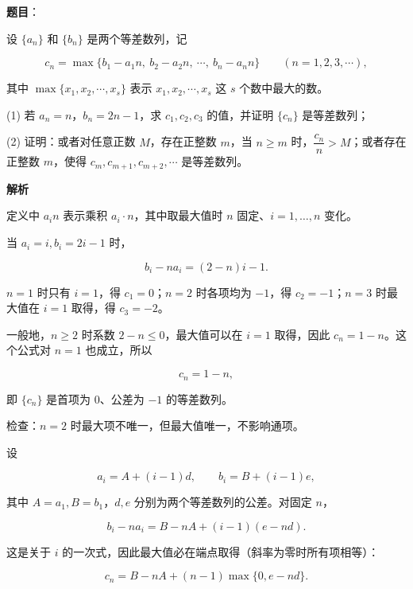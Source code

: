 \begin{answer}

\textbf{题目}：

设 $\{a_n\}$ 和 $\{b_n\}$ 是两个等差数列，记

\nopagebreak[4]
\[
c_n=\max\{b_1-a_1n,\ b_2-a_2n,\ \cdots,\ b_n-a_nn\}\qquad(n=1,2,3,\cdots),
\]

其中 $\max\{x_1,x_2,\cdots,x_s\}$ 表示 $x_1,x_2,\cdots,x_s$ 这 $s$ 个数中最大的数。

(1) 若 $a_n=n$，$b_n=2n-1$，求 $c_1,c_2,c_3$ 的值，并证明 $\{c_n\}$ 是等差数列；

(2) 证明：或者对任意正数 $M$，存在正整数 $m$，当 $n\geqslant m$ 时，$\dfrac{c_n}{n}>M$；或者存在正整数 $m$，使得 $c_m,c_{m+1},c_{m+2},\cdots$ 是等差数列。

\textbf{解析}

定义中 $a_i n$ 表示乘积 $a_i\cdot n$，其中取最大值时 $n$ 固定、$i=1,\ldots,n$ 变化。


当 $a_i=i,b_i=2i-1$ 时，

\nopagebreak[4]
\[b_i-na_i=(2-n)i-1.\]

$n=1$ 时只有 $i=1$，得 $c_1=0$；$n=2$ 时各项均为 $-1$，得 $c_2=-1$；$n=3$ 时最大值在 $i=1$ 取得，得 $c_3=-2$。

一般地，$n\geqslant2$ 时系数 $2-n\leqslant0$，最大值可以在 $i=1$ 取得，因此 $c_n=1-n$。这个公式对 $n=1$ 也成立，所以

\nopagebreak[4]
\[\boxed{c_n=1-n},\]

即 $\{c_n\}$ 是首项为 $0$、公差为 $-1$ 的等差数列。

检查：$n=2$ 时最大项不唯一，但最大值唯一，不影响通项。


设

\nopagebreak[4]
\[a_i=A+(i-1)d,\qquad b_i=B+(i-1)e,\]

其中 $A=a_1,B=b_1$，$d,e$ 分别为两个等差数列的公差。对固定 $n$，

\nopagebreak[4]
\[b_i-na_i=B-nA+(i-1)(e-nd).\]

这是关于 $i$ 的一次式，因此最大值必在端点取得（斜率为零时所有项相等）：

\nopagebreak[4]
\[\boxed{c_n=B-nA+(n-1)\max\{0,e-nd\}}.\tag{*}\]


\end{answer}
